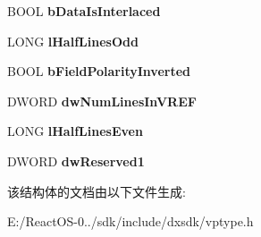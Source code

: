 \begin{DoxyCompactItemize}
B\+O\+OL {\bfseries b\+Data\+Is\+Interlaced}
\item 
\mbox{\label{struct___a_m_v_p_d_a_t_a_i_n_f_o_afaacf2c437ba2e69bc50906daea982fb}} 
L\+O\+NG {\bfseries l\+Half\+Lines\+Odd}
\item 
\mbox{\label{struct___a_m_v_p_d_a_t_a_i_n_f_o_aaafde2c37a35a4f24f91fecef3b704c3}} 
B\+O\+OL {\bfseries b\+Field\+Polarity\+Inverted}
\item 
\mbox{\label{struct___a_m_v_p_d_a_t_a_i_n_f_o_ad60a44dc623874aaf1d1362c3277adeb}} 
D\+W\+O\+RD {\bfseries dw\+Num\+Lines\+In\+V\+R\+EF}
\item 
\mbox{\label{struct___a_m_v_p_d_a_t_a_i_n_f_o_aa6559cf1b2d6fee2d5c79cd2a6ff0388}} 
L\+O\+NG {\bfseries l\+Half\+Lines\+Even}
\item 
\mbox{\label{struct___a_m_v_p_d_a_t_a_i_n_f_o_a5f3772a407f9efefd329f3e23f9280c9}} 
D\+W\+O\+RD {\bfseries dw\+Reserved1}
\end{DoxyCompactItemize}


该结构体的文档由以下文件生成\+:\begin{DoxyCompactItemize}
\item 
E\+:/\+React\+O\+S-\/0../sdk/include/dxsdk/vptype.\+h\end{DoxyCompactItemize}
